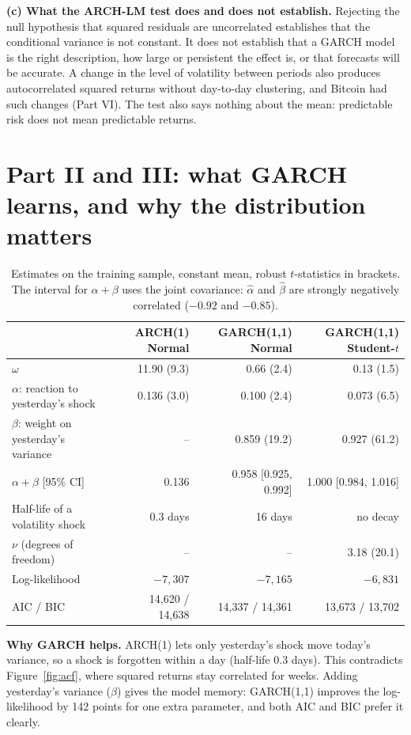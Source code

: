\documentclass[10pt,a4paper]{article}
\begin{document}
\textbf{(c) What the ARCH-LM test does and does not establish.} Rejecting the null hypothesis that squared residuals
are uncorrelated establishes that the conditional variance is not constant. It does not establish that a GARCH model
is the right description, how large or persistent the effect is, or that forecasts will be accurate. A change in the
level of volatility between periods also produces autocorrelated squared returns without day-to-day clustering, and
Bitcoin had such changes (Part VI). The test also says nothing about the mean: predictable risk does not mean
predictable returns.

\section{Part II and III: what GARCH learns, and why the distribution matters}

\begin{table}[h]
\centering\small
\begin{tabular}{lrrr}
\toprule
& ARCH(1) Normal & GARCH(1,1) Normal & GARCH(1,1) Student-$t$\\
\midrule
$\omega$ & 11.90 (9.3) & 0.66 (2.4) & 0.13 (1.5)\\
$\alpha$: reaction to yesterday's shock & 0.136 (3.0) & 0.100 (2.4) & 0.073 (6.5)\\
$\beta$: weight on yesterday's variance & -- & 0.859 (19.2) & 0.927 (61.2)\\
$\alpha+\beta$ [95\% CI] & 0.136 & 0.958 [0.925, 0.992] & 1.000 [0.984, 1.016]\\
Half-life of a volatility shock & 0.3 days & 16 days & no decay\\
$\nu$ (degrees of freedom) & -- & -- & 3.18 (20.1)\\
Log-likelihood & $-7{,}307$ & $-7{,}165$ & $-6{,}831$\\
AIC / BIC & 14,620 / 14,638 & 14,337 / 14,361 & 13,673 / 13,702\\
\bottomrule
\end{tabular}
\caption{Estimates on the training sample, constant mean, robust $t$-statistics in brackets. The interval for
$\alpha+\beta$ uses the joint covariance: $\hat\alpha$ and $\hat\beta$ are strongly negatively correlated ($-0.92$ and $-0.85$).}
\label{tab:garch}
\end{table}

\textbf{Why GARCH helps.} ARCH(1) lets only yesterday's shock move today's variance, so a shock is forgotten within a
day (half-life 0.3 days). This contradicts Figure~\ref{fig:acf}, where squared returns stay correlated for weeks. Adding
yesterday's variance ($\beta$) gives the model memory: GARCH(1,1) improves the log-likelihood by 142 points for one
extra parameter, and both AIC and BIC prefer it clearly.
\end{document}
